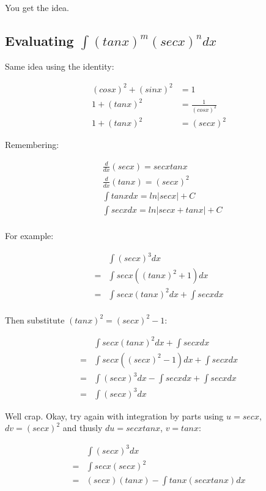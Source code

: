 \documentclass{article}
\begin{document}
You get the idea.

\newpage

\subsection{Evaluating $\int (tanx)^m (secx)^ndx$}

Same idea using the identity:

\begin{align*}
  (cosx)^2 + (sinx)^2 &= 1 \\
  1 + (tanx)^2 &= \frac{1}{(cosx)^2} \\
  1 + (tanx)^2 &= (secx)^2
\end{align*}

Remembering:

\begin{align*}
  &\frac{d}{dx} (secx) = secx tanx \\
  &\frac{d}{dx} (tanx) = (secx)^2 \\
  &\int tanx dx = ln \left| secx \right| + C \\
  &\int secx dx = ln \left| secx + tanx \right| + C \\
\end{align*}  

For example:

\begin{align*}
  &\int (secx)^3 dx \\
  = &\int secx ((tanx)^2 + 1) dx \\
  = &\int secx (tanx)^2 dx + \int secx dx \\
\end{align*}

Then substitute $(tanx)^2 = (secx)^2 - 1$:

\begin{align*}
  &\int secx (tanx)^2 dx + \int secx dx \\
  = &\int secx ((secx)^2 -1) dx + \int secx dx \\
  = &\int (secx)^3 dx - \int secx dx + \int secx dx \\
  = &\int (secx)^3 dx
\end{align*}

\newpage

Well crap.  Okay, try again with integration by parts using $u =
secx$, $dv = (secx)^2$ and thusly $du = secx tanx$, $v = tanx$:

\begin{align*}
  &\int (secx)^3 dx \\
  = &\int secx (secx)^2 \\
  = &(secx)(tanx) - \int tanx (secx tanx) dx
\end{align*}
\end{document}
